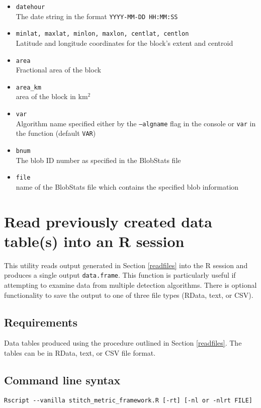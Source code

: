 \documentclass{article}
\begin{document}
\begin{itemize}
\item[]\texttt{datehour}\\The date string in the format \texttt{YYYY-MM-DD HH:MM:SS}
\item[] \texttt{minlat, maxlat, minlon, maxlon, centlat, centlon}\\ Latitude and longitude coordinates for the block's extent and centroid
\item[] \texttt{area}\\ Fractional area of the block
\item[] \texttt{area\_km}\\area of the block in km$^2$
\item[] \texttt{var}\\ Algorithm name specified either by the \texttt{--algname} flag in the console or \texttt{var} in the function (default \texttt{VAR})
\item[] \texttt{bnum} \\The blob ID number as specified in the BlobStats file
\item[] \texttt{file} \\name of the BlobStats file which contains the specified blob information
\end{itemize}

\section{Read previously created data table(s) into an R session}\label{combinetable}
This utility reads output  generated in Section \ref{readfiles} into the R session and produces a single output \texttt{data.frame}. This function is particularly useful if attempting to examine data from multiple detection algorithms. There is optional functionality to save the output to one of three file types (RData, text, or CSV).

\subsection{Requirements}
Data tables produced using the procedure outlined in Section \ref{readfiles}. The tables can be in RData, text, or CSV file format.

\subsection{Command line syntax}
\begin{verbatim}
Rscript --vanilla stitch_metric_framework.R [-rt] [-nl or -nlrt FILE] 
\end{verbatim}
\end{document}
